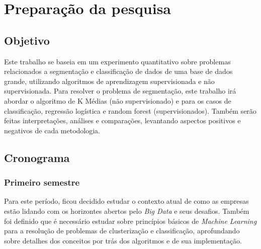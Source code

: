 
\part{Preparação da pesquisa}

\chapter{Objetivo}

Este trabalho se baseia em um experimento quantitativo sobre problemas relacionados a segmentação e classificação de dados de uma base de dados grande, utilizando algoritmos de aprendizagem supervisionada e não supervisionada. Para resolver o problema de segmentação, este trabalho irá abordar o algoritmo de K Médias (não supervisionado) e para os casos de classificação, regressão logística e random forest (supervisionados). Também serão feitas interpretações, análises e comparações, levantando aspectos positivos e negativos de cada metodologia.

\chapter{Cronograma}

\section{Primeiro semestre}

Para este período, ficou decidido estudar o contexto atual de como as empresas estão lidando com os horizontes abertos pelo \emph{Big Data} e seus desafios. Também foi definido que é necessário estudar sobre princípios básicos de \emph{Machine Learning} para a resolução de problemas de clusterização e classificação, aprofundando sobre detalhes dos conceitos por trás dos algoritmos e de sua implementação.


